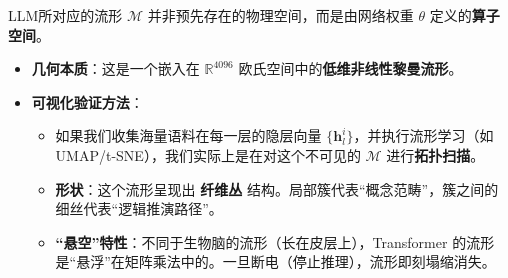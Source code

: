 
LLM所对应的流形 $\mathcal{M}$ 并非预先存在的物理空间，而是由网络权重 $\theta$ 定义的\textbf{算子空间}。
\begin{itemize}
    \item  \textbf{几何本质}：这是一个嵌入在 $\mathbb{R}^{4096}$ 欧氏空间中的\textbf{低维非线性黎曼流形}。
    \item \textbf{可视化验证方法}：
    \begin{itemize}
        \item 如果我们收集海量语料在每一层的隐层向量 $\{\mathbf{h}_l^i\}$，并执行流形学习（如 UMAP/t-SNE），我们实际上是在对这个不可见的 $\mathcal{M}$ 进行\textbf{拓扑扫描}。
        \item \textbf{形状}：这个流形呈现出 \textbf{纤维丛} 结构。局部簇代表“概念范畴”，簇之间的细丝代表“逻辑推演路径”。
        \item \textbf{“悬空”特性}：不同于生物脑的流形（长在皮层上），Transformer 的流形是“悬浮”在矩阵乘法中的。一旦断电（停止推理），流形即刻塌缩消失。
    \end{itemize}
\end{itemize}



